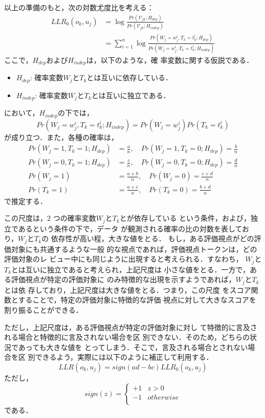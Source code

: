 \documentclass[japanese]{jnlp_1.4}
\def\eq#1{}
\begin{document}
以上の準備のもと，次の対数尤度比を考える：
{\allowdisplaybreaks
\begin{align}
LLR_0(o_k,u_j) & = \log\frac{Pr(\mathcal{V}_{jk}; H_{dep})}{Pr(\mathcal{V}_{jk}; H_{indep})}
	\nonumber \\
 & = \sum_{i=1}^{n}\log\frac{Pr(W_j=w^{i}_j,T_k=t^{i}_k;H_{\mathit{dep}})}{Pr(W_j=w^{i}_j,T_k=t^{i}_k;H_{\mathit{indep}})}
	\label{eq:llr0}
\end{align}
}
ここで，$H_\mathit{dep}$および$H_\mathit{indep}$は，以下のような，確
率変数に関する仮説である．
\begin{itemize}
 \item $H_\mathit{dep}$: 確率変数$W_j$と$T_k$とは互いに依存している．
 \item $H_\mathit{indep}$: 確率変数$W_j$と$T_k$とは互いに独立である．
\end{itemize}
\eq{llr0}において，$H_\mathit{indep}$の下では，
\[
Pr(W_j=w^i_j, T_k=t^i_k; H_\mathit{indep}) = Pr(W_j=w^i_j)Pr(T_k=t^i_k)
\]
が成り立つ．また，各種の確率は，
\begin{align*}
Pr(W_j=1, T_k=1; H_\mathit{dep}) & = \frac{a}{n} ,\quad 
	Pr(W_j=1, T_k=0; H_\mathit{dep}) =  \frac{b}{n} \\
Pr(W_j=0, T_k=1; H_\mathit{dep}) & = \frac{c}{n} ,\quad 
	Pr(W_j=0, T_k=0; H_{dep}) =  \frac{d}{n} \\
Pr(W_j=1) & = \frac{a+b}{n} , \quad
	Pr(W_j=0) =  \frac{c+d}{n} \\
Pr(T_k=1) & = \frac{a+c}{n} ,\quad 
	Pr(T_k=0) =  \frac{b+d}{n}
\end{align*}
で推定する．

この尺度は，2 つの確率変数$W_j$と$T_k$とが依存している
という条件，および，独立であるという条件の下で，データ
が観測される確率の比の対数を表しており，$W_j$と$T_k$の
依存性が高い程，大きな値をとる．
もし，ある評価視点がどの評価対象にも共通するような一般
的な視点であれば，評価視点トークンは，どの評価対象のレ
ビュー中にも同じように出現すると考えられる．すなわち，
$W_j$と$T_k$とは互いに独立であると考えられ，上記尺度は
小さな値をとる．一方で，ある評価視点が特定の評価対象に
のみ特徴的な出現を示すようであれば，$W_j$と$T_k$とは依
存しており，上記尺度は大きな値をとる．つまり，この尺度
をスコア関数とすることで，特定の評価対象に特徴的な評価
視点に対して大きなスコアを割り振ることができる．

ただし，上記尺度は，ある評価視点が特定の評価対象に対し
て特徴的に言及される場合と特徴的に言及されない場合を区
別できない．そのため，どちらの状況であっても大きな値を
とってしまう．そこで，言及される場合とされない場合を区
別できるよう，実際には以下のように補正して利用する．
\pagebreak
\begin{equation}
LLR(o_k,u_j) = sign(ad - bc)LLR_{0}(o_k,u_j)
\label{eq:finalrank}
\end{equation}
ただし，
\begin{equation}
sign(z) = \begin{cases}
  +1 & z > 0 \\
  -1 & \mathit{otherwise}\\
  \end{cases}
\end{equation}
である．
\end{document}
